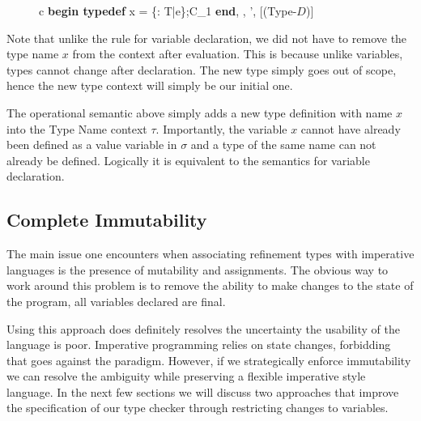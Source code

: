 \documentclass[a4paper,12pt]{report}
\begin{document}
\begin{figure}[H]
  \begin{center}
    \begin{tabular} {c}
      {\langle \textbf{begin typedef }x = \{\upsilon : T\text{ }|\text{ }e\};C_1\textbf{ end}, 
      \sigma, \tau \rangle \longrightarrow 
        \langle \sigma', \tau \rangle} [(Type-$D$)]
    \end{tabular}
  \end{center}
\end{figure}

\par
Note that unlike the rule for variable declaration, we did not have to remove 
the type name $x$ from the context after evaluation. This is because unlike 
variables, types cannot change after declaration. The new type simply goes 
out of scope, hence the new type context will simply be our initial one. 

\par
The operational semantic above simply adds a new type definition with name $x$ 
into the Type Name context $\tau$. Importantly, the variable $x$ cannot have 
already been defined as a value variable in $\sigma$ and a type of the same name 
can not already be defined. Logically it is equivalent to the semantics for 
variable declaration.

\subsection{Complete Immutability}
The main issue one encounters when associating refinement types with imperative 
languages is the presence of mutability and assignments. The obvious way to 
work around this problem is to remove the ability to make changes to the state 
of the program, all variables declared are final.

\par
Using this approach does definitely resolves the uncertainty the usability of 
the language is poor. Imperative programming relies on state changes, forbidding 
that goes against the paradigm. However, if we strategically enforce immutability 
we can resolve the ambiguity while preserving a flexible imperative style 
language. In the next few sections we will discuss two approaches that 
improve the specification of our type checker through restricting changes to 
variables. 
\end{document}
